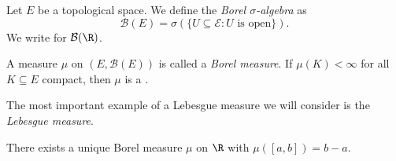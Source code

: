 \documentclass[a4paper]{article}
\begin{document}
\begin{defi}
  Let $E$ be a topological space. We define the \emph{Borel $\sigma$-algebra} as
  \[
    \mathcal{B}(E) = \sigma(\{U \subseteq \mathcal{E}: U \text{ is open}\}).
  \]
  We write  for $\mathcal{B}(\R)$.
\end{defi}

\begin{defi}
  A measure $\mu$ on $(E, \mathcal{B}(E))$ is called a \emph{Borel measure}. If $\mu(K) < \infty$ for all $K \subseteq E$ compact, then $\mu$ is a .
\end{defi}
The most important example of a Lebesgue measure we will consider is the \emph{Lebesgue measure}.

\begin{thm}
  There exists a unique Borel measure $\mu$ on $\R$ with $\mu([a, b]) = b - a$.
\end{thm}
\end{document}
